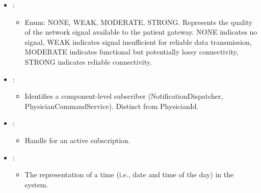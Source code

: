 \begin{itemize}[nolistsep,noitemsep]
\begin{itemize}
\end{itemize}

\item {}: 
\begin{itemize}[noitemsep,nolistsep]

\item[] Enum: NONE, WEAK, MODERATE, STRONG.
Represents the quality of the network signal available to the patient gateway. NONE indicates no signal, WEAK indicates signal insufficient for reliable data transmission, MODERATE indicates functional but potentially lossy connectivity, STRONG indicates reliable connectivity.
\end{itemize}

\item {}: 
\begin{itemize}[noitemsep,nolistsep]

\item[] Identifies a component-level subscriber (NotificationDispatcher, PhysicianCommandService). Distinct from PhysicianId.
\end{itemize}

\item {}: 
\begin{itemize}[noitemsep,nolistsep]

\item[] Handle for an active subscription.
\end{itemize}

\item {}: 
\begin{itemize}[noitemsep,nolistsep]

\item[] The representation of a time (i.e., date and time of the day) in the system.
\end{itemize}

\end{itemize}

